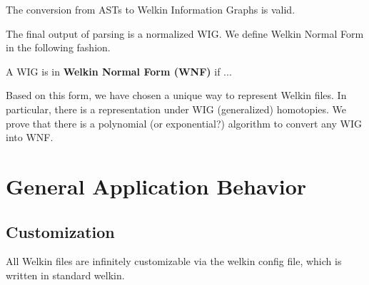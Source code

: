 \begin{lemma}
The conversion from ASTs to Welkin Information Graphs is valid.
\end{lemma}
The final output of parsing is a normalized WIG. We define Welkin Normal Form in the following fashion.
\begin{definition}
A WIG is in \textbf{Welkin Normal Form (WNF)} if ...
\end{definition}
Based on this form, we have chosen a unique way to represent Welkin files. In particular, there is a representation under WIG (generalized) homotopies. We prove that there is a polynomial (or exponential?) algorithm to convert any WIG into WNF.

\section{General Application Behavior}


\subsection{Customization}
All Welkin files are infinitely customizable via the welkin config file, which is written in standard welkin.

